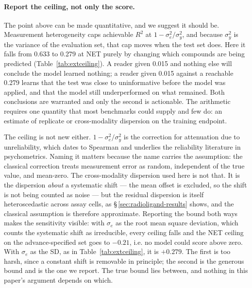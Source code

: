 \documentclass[11pt,a4paper]{article}
\begin{document}
\paragraph{Report the ceiling, not only the score.} The point above can be made
quantitative, and we suggest it should be. Measurement heterogeneity caps achievable
$R^2$ at $1-\sigma^2_e/\sigma^2_y$, and because $\sigma^2_y$ is the variance of the
evaluation set, that cap moves when the test set does. Here it falls from 0.633 to
0.279 at NET purely by changing which compounds are being predicted
(Table~\ref{tab:extceiling}). A reader given 0.015 and nothing else will conclude the
model learned nothing; a reader given 0.015 against a reachable 0.279 learns that the
test was close to uninformative before the model was applied, and that the model still
underperformed on what remained. Both conclusions are warranted and only the second is
actionable. The arithmetic requires one quantity that most benchmarks could supply and
few do: an estimate of replicate or cross-modality dispersion on the training endpoint.

The ceiling is not new either. $1-\sigma^2_e/\sigma^2_y$ is the correction for attenuation
due to unreliability, which dates to Spearman and underlies the reliability literature in
psychometrics.\cite{Spearman1904} Naming it matters because the name carries the
assumption: the classical correction treats measurement error as random, independent of
the true value, and mean-zero. The cross-modality dispersion used here is not that. It is
the dispersion \emph{about} a systematic shift --- the mean offset is excluded, so the
shift is not being counted as noise --- but the residual dispersion is itself
heteroscedastic across assay cells, as \S\,\ref{sec:radioligand-results} shows, and the
classical assumption is therefore approximate. Reporting the bound both ways makes the
sensitivity visible: with $\sigma_e$ as the root mean square deviation, which counts the
systematic shift as irreducible, every ceiling falls and the NET ceiling on the
advance-specified set goes to $-0.21$, i.e. no model could score above zero. With
$\sigma_e$ as the SD, as in Table~\ref{tab:extceiling}, it is $+0.279$. The first is too
harsh, since a constant shift is removable in principle; the second is the generous bound
and is the one we report. The true bound lies between, and nothing in this paper's
argument depends on which.
\end{document}
